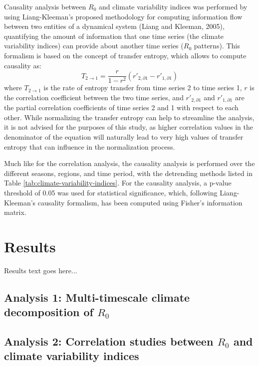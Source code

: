 \documentclass[
	a4paper, %
	8pt, %
	unnumberedsections, %
	twoside, %
]{LTJournalArticle}
\begin{document}
  Causality analysis between $R_0$ and climate variability indices was performed by using Liang-Kleeman's proposed methodology for computing information flow between two entities of a dynamical system (Liang and Kleeman, 2005), quantifying the amount of information that one time series (the climate variability indices) can provide about another time series ($R_0$ patterns). This formalism is based on the concept of transfer entropy, which allows to compute causality as:
  \begin{equation}
      T_{2 \rightarrow 1} = \frac{r}{1-r^2}(r'_{2,\partial 1} - r'_{1,\partial 1})
  \end{equation}
  where $T_{2 \rightarrow 1}$ is the rate of entropy transfer from time series 2 to time series 1, $r$ is the correlation coefficient between the two time series, and $r'_{2,\partial 1}$ and $r'_{1,\partial 1}$ are the partial correlation coefficients of time series 2 and 1 with respect to each other. While normalizing the transfer entropy can help to streamline the analysis, it is not advised for the purposes of this study, as higher correlation values in the denominator of the equation will naturally lead to very high values of transfer entropy that can influence in the normalization process.

  Much like for the correlation analysis, the causality analysis is performed over the different seasons, regions, and time period, with the detrending methods listed in Table \ref{tab:climate-variability-indices}. For the causality analysis, a p-value threshold of 0.05 was used for statistical significance, which, following Liang-Kleeman's causality formalism, has been computed using Fisher's information matrix. 


  \section{Results}

  Results text goes here...

  \subsection{Analysis 1: Multi-timescale climate decomposition of $R_0$} \label{sec-results-1}

  \subsection{Analysis 2: Correlation studies between $R_0$ and climate variability indices} \label{sec-results-2} \label{sec-results-2}
\end{document}
